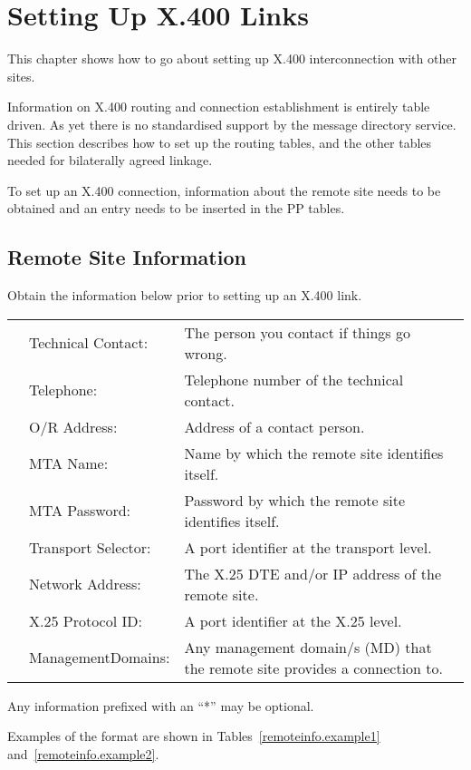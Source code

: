 \chapter {Setting Up X.400 Links}

This chapter shows how to go about setting up X.400 interconnection
with other sites.

Information on X.400 routing and connection establishment is entirely
table driven. As yet there is no standardised support by the message
directory service. This section describes how to set up the 
routing tables, and the other tables needed for bilaterally agreed
linkage.

To set up an X.400 connection, information about the remote site
needs to be obtained and an entry needs to be inserted in the PP tables.

\section {Remote Site Information}

Obtain the information below prior to setting up an X.400 link.

\label {lab.remoteinfo}
\begin {tabular}{l l p{}}
\tt&	Technical Contact:&	The person you contact if things go wrong.\\
\tt&	Telephone:&		Telephone number of the technical contact.\\
\tt*&	O/R Address:&		Address of a contact person.\\
\tt*&	MTA Name:&		Name by which the remote site identifies itself.\\
\tt*&	MTA Password:&		Password by which the remote site identifies itself.\\
\tt*&	Transport Selector:&	A port identifier at the transport level.\\
\tt&	Network Address:&	The X.25 DTE and/or IP address of the remote site.\\
\tt*&	X.25 Protocol ID:&	A port identifier at the X.25 level.\\
\tt*&	ManagementDomains:&	Any management domain/s (MD) that 
			the remote site provides a connection to.\\
\end{tabular}

Any information prefixed with an ``*'' may be optional.

Examples of the format are shown in Tables~\ref{remoteinfo.example1}
and~\ref{remoteinfo.example2}.

